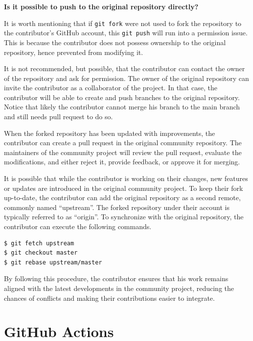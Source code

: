 \begin{mdframed}
\textbf{Is it possible to push to the original repository directly?}

It is worth mentioning that if \verb|git fork| were not used to fork the repository to the contributor's GitHub account, this \verb|git push| will run into a permission issue. This is because the contributor does not possess ownership to the original repository, hence prevented from modifying it.

It is not recommended, but possible, that the contributor can contact the owner of the repository and ask for permission. The owner of the original repository can invite the contributor as a collaborator of the project. In that case, the contributor will be able to create and push branches to the original repository. Notice that likely the contributor cannot merge his branch to the main branch and still needs pull request to do so.

\end{mdframed}

When the forked repository has been updated with improvements, the contributor can create a pull request in the original community repository. The maintainers of the community project will review the pull request, evaluate the modifications, and either reject it, provide feedback, or approve it for merging.

It is possible that while the contributor is working on their changes, new features or updates are introduced in the original community project. To keep their fork up-to-date, the contributor can add the original repository as a second remote, commonly named ``upstream''. The forked repository under their account is typically referred to as ``origin''. To synchronize with the original repository, the contributor can execute the following commands.
\begin{lstlisting}
$ git fetch upstream
$ git checkout master
$ git rebase upstream/master
\end{lstlisting}

By following this procedure, the contributor ensures that his work remains aligned with the latest developments in the community project, reducing the chances of conflicts and making their contributions easier to integrate.

\section{GitHub Actions}

